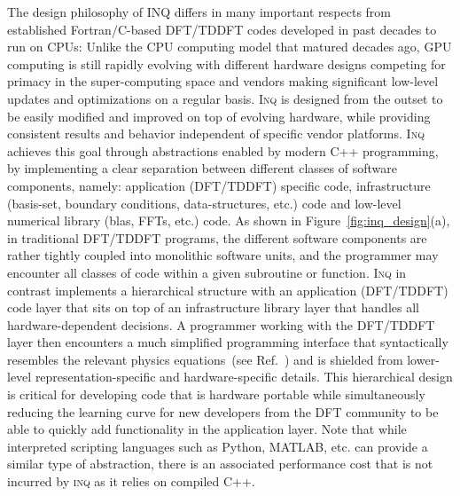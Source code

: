  The design philosophy of INQ differs in many important respects from established Fortran/C-based DFT/TDDFT codes developed in past decades to run on CPUs: Unlike the CPU computing model that matured decades ago, GPU computing is still rapidly evolving with different hardware designs competing for primacy in the super-computing space and vendors making significant low-level updates and optimizations on a regular basis.
\textsc{Inq} is designed from the outset to be easily modified and improved on top of evolving hardware, while providing consistent results and behavior independent of specific vendor platforms. 
\textsc{Inq} achieves this goal through abstractions enabled by modern C++ programming, by implementing a clear separation between different classes of software components, namely: application (DFT/TDDFT) specific code, infrastructure (basis-set, boundary conditions, data-structures, etc.) code and low-level numerical library (blas, FFTs, etc.) code. 
\newline 
\newline
As shown in Figure~\ref{fig:inq_design}(a), in traditional DFT/TDDFT programs, the different software components are rather tightly coupled into monolithic software units, and the programmer may encounter all classes of code within a given subroutine or function. 
\textsc{Inq} in contrast implements a hierarchical structure with an application (DFT/TDDFT) code layer that sits on top of an infrastructure library layer that handles all hardware-dependent decisions. 
A programmer working with the DFT/TDDFT layer then encounters a much simplified programming interface that syntactically resembles the relevant physics equations~(see Ref.~\cite{Andrade2021}) and is shielded from lower-level representation-specific and hardware-specific details. 
This hierarchical design is critical for developing code that is hardware portable while simultaneously reducing the learning curve for new developers from the DFT community to be able to quickly add functionality in the application layer. 
Note that while interpreted scripting languages such as Python, MATLAB, etc. can provide a similar type of abstraction, there is an associated performance cost that is not incurred by \textsc{inq} as it relies on compiled C++.

